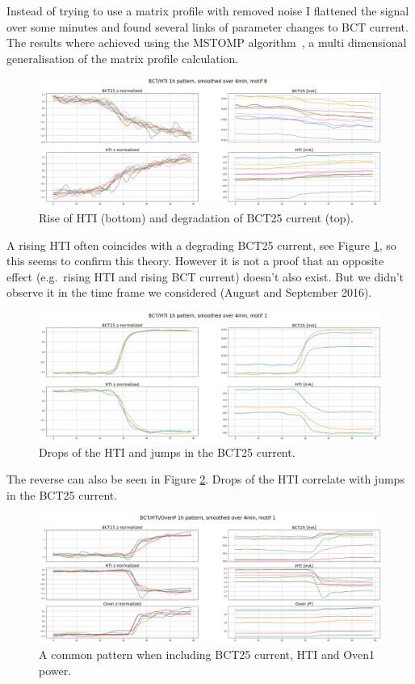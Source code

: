 \documentclass[12pt,a4paper]{article}
\begin{document}
Instead of trying to use a matrix profile with removed noise I flattened the signal over some minutes and found several links of parameter changes to BCT current. The results where achieved using the MSTOMP algorithm~\cite{Yeh:MatrixProfileVI}, a multi dimensional
generalisation of the matrix profile calculation.

\begin{figure}
\centering
\includegraphics{images/hti_bct_htirise.png}
\caption{Rise of HTI (bottom) and degradation of BCT25 current (top).}
\label{fig:hti_bct_htirise}
\end{figure}

A rising HTI often coincides with a degrading BCT25 current, see Figure \ref{fig:hti_bct_htirise}, so this seems to confirm this theory. However it is not a proof that an opposite effect (e.g.~rising HTI and rising BCT current) doesn't also exist. But we didn't observe it in the time frame we considered (August and September 2016).

\begin{figure}
\centering
\includegraphics{images/hti_bct_htifall.png}
\caption{Drops of the HTI and jumps in the BCT25 current.}
\label{fig:hti_bct_htifall}
\end{figure}

The reverse can also be seen in Figure \ref{fig:hti_bct_htifall}. Drops of the HTI correlate with jumps in the BCT25 current.

\begin{figure}
\centering
\includegraphics{images/bct_oven_hti.png}
\caption{A common pattern when including BCT25 current, HTI and Oven1 power.}
\label{fig:bct_oven_hti}
\end{figure}
\end{document}
